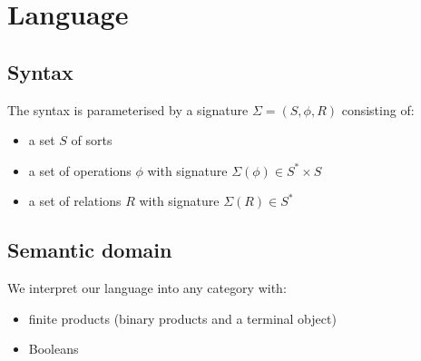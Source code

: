 \section{Language}

\subsection{Syntax}

The syntax is parameterised by a signature $\Sigma = (S, \phi, R)$ consisting of:
\begin{itemize}
\item a set $S$ of sorts
\item a set of operations $\phi$ with signature $\Sigma(\phi) \in S^* \times S$
\item a set of relations $R$ with signature $\Sigma(R) \in S^*$
\end{itemize}



\subsection{Semantic domain}

We interpret our language into any category with:
\begin{itemize}
\item finite products (binary products and a terminal object)
\item Booleans
\end{itemize}
